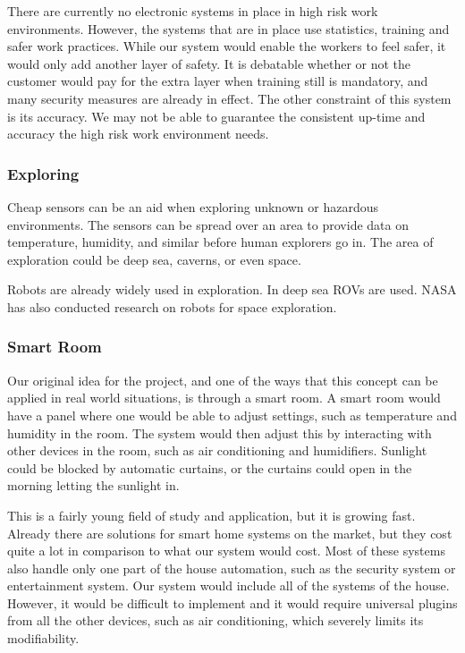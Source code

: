 \documentclass[../document]{subfiles}
\begin{document}
There are currently no electronic systems in place in high risk work environments. However, the systems that are in place use statistics, training and safer work practices. While our system would enable the workers to feel safer, it would only add another layer of safety. It is debatable whether or not the customer would pay for the extra layer when training still is mandatory, and many security measures are already in effect. The other constraint of this system is its accuracy. We may not be able to guarantee the consistent up-time and accuracy the high risk work environment needs.

\subsubsection{Exploring}
Cheap sensors can be an aid when exploring unknown or hazardous environments. The sensors can be spread over an area to provide data on temperature, humidity, and similar before human explorers go in. The area of exploration could be deep sea, caverns, or even space.

Robots are already widely used in exploration. In deep sea ROVs are used. NASA has also conducted research on robots for space exploration.

\subsubsection{Smart Room}
Our original idea for the project, and one of the ways that this concept can be applied in real world situations, is through a smart room. A smart room would have a panel where one would be able to adjust settings, such as temperature and humidity in the room. The system would then adjust this by interacting with other devices in the room, such as air conditioning and humidifiers. Sunlight could be blocked by automatic curtains, or the curtains could open in the morning letting the sunlight in.

This is a fairly young field of study and application, but it is growing fast. Already there are solutions for smart home systems on the market, but they cost quite a lot in comparison to what our system would cost. Most of these systems also handle only one part of the house automation, such as the security system or entertainment system. Our system would include all of the systems of the house. However, it would be difficult to implement and it would require universal plugins from all the other devices, such as air conditioning, which severely limits its modifiability.
\end{document}
